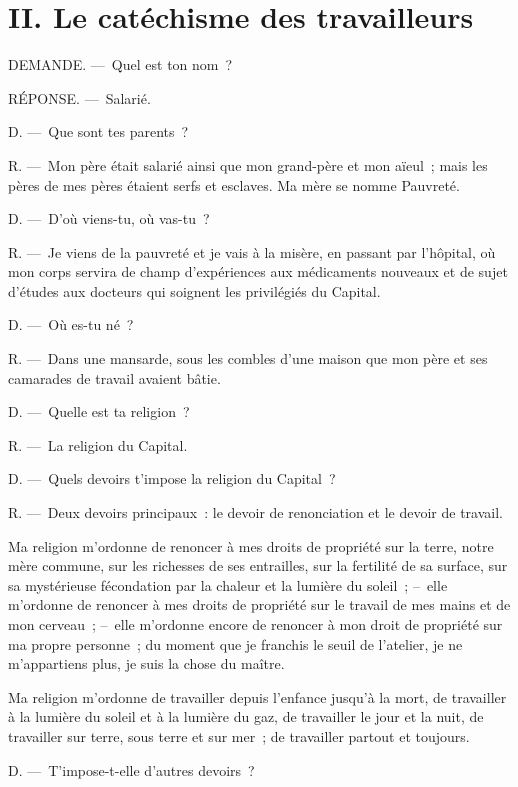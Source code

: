 \documentclass[french,twoside]{book} %
\newcommand\chapteropen{} %
\newcommand\chaptercont{} %
\begin{document}
\chapteropen
\chapter[{II. Le catéchisme des travailleurs}]{II. Le catéchisme des travailleurs}\renewcommand{\leftmark}{II. Le catéchisme des travailleurs}


\chaptercont
DEMANDE. — Quel est ton nom ?\par
RÉPONSE. — Salarié.\par
D. — Que sont tes parents ?\par
R. — Mon père était salarié ainsi que mon grand-père et mon aïeul ; mais les pères de mes pères étaient serfs et esclaves. Ma mère se nomme Pauvreté.\par
D. — D'où viens-tu, où vas-tu ?\par
R. — Je viens de la pauvreté et je vais à la misère, en passant par l’hôpital, où mon corps servira de champ d’expériences aux médicaments nouveaux et de sujet d’études aux docteurs qui soignent les privilégiés du Capital.\par
D. — Où es-tu né ?\par
R. — Dans une mansarde, sous les combles d’une maison que mon père et ses camarades de travail avaient bâtie.\par
D. — Quelle est ta religion ?\par
R. — La religion du Capital.\par
D. — Quels devoirs t’impose la religion du Capital ?\par
R. — Deux devoirs principaux : le devoir de renonciation et le devoir de travail.\par
Ma religion m’ordonne de renoncer à mes droits de propriété sur la terre, notre mère commune, sur les richesses de ses entrailles, sur la fertilité de sa surface, sur sa mystérieuse fécondation par la chaleur et la lumière du soleil ; – elle m’ordonne de renoncer à mes droits de propriété sur le travail de mes mains et de mon cerveau ; – elle m’ordonne encore de renoncer à mon droit de propriété sur ma propre personne ; du moment que je franchis le seuil de l’atelier, je ne m’appartiens plus, je suis la chose du maître.\par
Ma religion m’ordonne de travailler depuis l’enfance jusqu’à la mort, de travailler à la lumière du soleil et à la lumière du gaz, de travailler le jour et la nuit, de travailler sur terre, sous terre et sur mer ; de travailler partout et toujours.\par
D. — T'impose-t-elle d’autres devoirs ?\par
\end{document}
